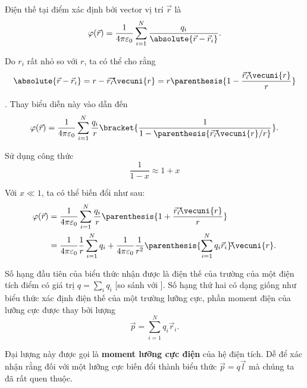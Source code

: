 Điện thế tại điểm xác định bởi vector vị trí $\vec{r}$ là
\begin{equation}\label{eq:1_63}
	\varphi(\vec{r}) = \frac{1}{4\pi\varepsilon_0} \sum_{i=1}^N \frac{q_i}{\absolute{\vec{r} - \vec{r}_i}}.
\end{equation}

\noindent
Do $r_i$ rất nhỏ so với $r$, ta có thể cho rằng
\begin{equation*}
	\absolute{\vec{r} - \vec{r}_i} = r - \vec{r}_i\!\vec{\cdot}\!\vecuni{r} = r\parenthesis{1 - \frac{\vec{r}_i\!\vec{\cdot}\!\vecuni{r}}{r}}
\end{equation*}

. Thay biểu diễn này vào  dẫn đến
\begin{equation}\label{eq:1_64}
	\varphi(\vec{r}) = \frac{1}{4\pi\varepsilon_0} \sum_{i=1}^N \frac{q_i}{r} \bracket{\frac{1}{1 - \parenthesis{\vec{r}_i\!\vec{\cdot}\!\vecuni{r}/r}}}.
\end{equation}

\noindent
Sử dụng công thức
\begin{equation*}
	\frac{1}{1-x} \approx 1 + x
\end{equation*}

\noindent
Với $x\ll 1$, ta có thể biến đổi  như sau:
\begin{align}
	\varphi(\vec{r}) &= \frac{1}{4\pi\varepsilon_0} \sum_{i=1}^N \frac{q_i}{r} \parenthesis{1 + \frac{\vec{r}_i\!\vec{\cdot}\!\vecuni{r}}{r}}\nonumber\\
	&= \frac{1}{4\pi\varepsilon_0} \frac{1}{r} \sum_{i=1}^N q_i + \frac{1}{4\pi\varepsilon_0} \frac{1}{r^2} \parenthesis{\sum_{i=1}^N q_i \vec{r}_i}\!\vec{\cdot}\!\vecuni{r}. \label{eq:1_65}
\end{align}

\noindent
Số hạng đầu tiên của biểu thức nhận được là điện thế của trường của một điện tích điểm có giá trị $q=\sum_iq_i$ [so sánh với ]. Số hạng thứ hai có dạng giống như biểu thức xác định điện thế của một trường lưỡng cực, phần moment điện của lưỡng cực được thay bởi lượng
\begin{equation}\label{eq:1_66}
	\vec{p} = \sum_{i=1}^N q_i \vec{r}_i.
\end{equation}

\noindent
Đại lượng này được gọi là \textbf{moment lưỡng cực điện} của hệ điện tích. Dễ để xác nhận rằng đối với một lưỡng cực  biến đổi thành biểu thức $\vec{p}=q\vec{l}$ mà chúng ta đã rất quen thuộc.

